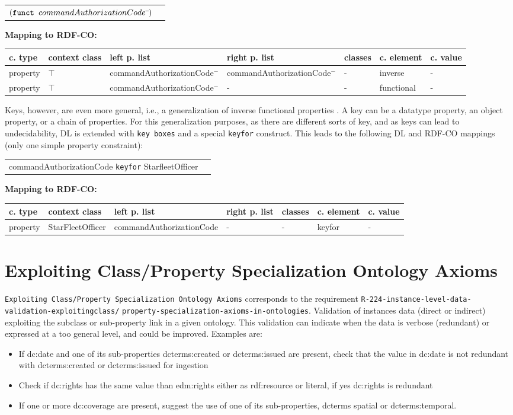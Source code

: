 \documentclass{llncs}
\newcommand{\ms}[1]{\texttt{#1}}
\newenvironment{gcotable}{
  \scriptsize
  \sffamily
  \vspace{0cm}
	\begin{center}
	\textbf{\vspace{0.4cm}Mapping to RDF-CO:} \\
  \begin{tabular}{l|l|l|l|l|l|l}
	\hline
  \textbf{c. type} & \textbf{context class} & \textbf{left p. list} & \textbf{right p. list} & \textbf{classes} & \textbf{c. element} & \textbf{c. value} \\
  \hline

}{
  \hline
  \end{tabular}
	\end{center}
}
\newenvironment{DL}{
  \vspace{0cm}
	\begin{center}
  \begin{tabular}{r l}

}{
  \end{tabular}
	\end{center}
}
\begin{document}
\begin{DL}
$(\ms{funct } commandAuthorizationCode\sp{\overline{\ }})$
\end{DL}

\begin{gcotable}
property & $\top$ & commandAuthorizationCode$^{-}$ & commandAuthorizationCode$^{-}$ & - & inverse & - \\
property & $\top$ & commandAuthorizationCode$^{-}$ & - & - & functional & - \\
\end{gcotable}

Keys, however, are even more general, i.e., a generalization of inverse functional properties \cite{Schneider2009}.
A key can be a datatype property, an object property, or a chain of properties.
For this generalization purposes, as there are different sorts of key, and as keys can lead to undecidability, 
DL is extended with \ms{key boxes} and a special \ms{keyfor} construct\cite{Lutz2005}.
This leads to the following DL and RDF-CO mappings (only one simple property constraint):

\begin{DL}
commandAuthorizationCode \ms{keyfor} StarfleetOfficer
\end{DL}

\begin{gcotable}
property & StarFleetOfficer & commandAuthorizationCode & - & - & keyfor & - \\
\end{gcotable}

\section{Exploiting Class/Property Specialization Ontology Axioms}

\ms{Exploiting Class/Property Specialization Ontology Axioms} corresponds to the requirement
\ms{R-224-instance-level-data-validation-exploitingclass/} \ms{property-specialization-axioms-in-ontologies}.
Validation of instances data (direct or indirect) exploiting the subclass or sub-property link in a given ontology.
This validation can indicate when the data is verbose (redundant) or expressed at a too general level, and could be improved.
Examples are:
\begin{itemize}
	\item If dc:date and one of its sub-properties dcterms:created or dcterms:issued are present, check that the value in dc:date is not redundant with dcterms:created or dcterms:issued for ingestion
  \item Check if dc:rights has the same value than edm:rights either as rdf:resource or literal, if yes dc:rights is redundant
  \item If one or more dc:coverage are present, suggest the use of one of its sub-properties, dcterms spatial or dcterms:temporal.
\end{itemize}
\end{document}
